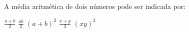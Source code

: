 A média aritmética de dois números pode ser indicada por:

$\frac{a+b}{2}$
$\frac{ab}{2}$
$(a+b)^2$
$\frac{x+y}{3}$
$(xy)^2$




